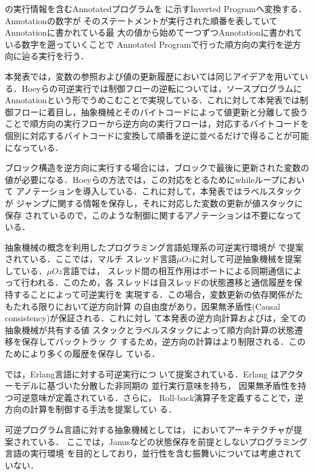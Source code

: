 \documentclass[submit,PRO]{ipsj}
\begin{document}
の実行情報を含むAnnotatedプログラムを
に示すInverted Programへ変換する．Annotationの数字が
そのステートメントが実行された順番を表していてAnnotationに書かれている最
大の値から始めて一つずつAnnotationに書かれている数字を遡っていくことで
Annotated Programで行った順方向の実行を逆方向に辿る実行を行う．

本発表では，変数の参照および値の更新履歴においては同じアイデアを用いてい
る．Hoeyらの可逆実行では制御フローの逆転については，ソースプログラムに
Annotationという形でうめこむことで実現している．これに対して本発表では制
御フローに着目し，抽象機械とそのバイトコードによって値更新と分離して扱う
ことで順方向の実行フローから逆方向の実行フローは，対応するバイトコードを
個別に対応するバイトコードに変換して順番を逆に並べるだけで得ることが可能
になっている．

ブロック構造を逆方向に実行する場合には，ブロックで最後に更新された変数の
値が必要になる．Hoeyらの方法では，この対応をとるためにwhileループにおいて
アノテーションを導入している．これに対して，本発表ではラベルスタックが
ジャンプに関する情報を保存し，それに対応した変数の更新が値スタックに保存
されているので，このような制御に関するアノテーションは不要になっている．

抽象機械の概念を利用したプログラミング言語処理系の可逆実行環境が
\cite{DBLP:conf/forte/LienhardtLMS12}で提案されている．ここでは，マルチ
スレッド言語$\mu Oz$に対して可逆抽象機械を提案している．$\mu Oz$言語では，
スレッド間の相互作用はポートによる同期通信によって行われる．このため，各
スレッドは自スレッドの状態遷移と通信履歴を保持することによって可逆実行を
実現する．この場合，変数更新の依存関係がたもたれる限りにおいて逆方向計算
の自由度があり，因果無矛盾性(Causal consistency)が保証される．これに対し
て本発表の逆方向計算および\cite{Hoey20PHD}は，全ての抽象機械が共有する値
スタックとラベルスタックによって順方向計算の状態遷移を保存してバックトラッ
ク
\cite{DBLP:journals/software/AgrawalDS91,DBLP:journals/corr/abs-1709-00828}
するため，逆方向の計算はより制限される．このためにより多くの履歴を保存し
ている．

\cite{DBLP:journals/jlp/LaneseNPV18}では，Erlang言語に対する可逆実行につ
いて提案されている．Erlang%
はアクターモデルに基づいた分散した非同期の%
並行実行意味を持ち，%
因果無矛盾性を持つ可逆意味が定義されている．さらに，
Roll-back演算子を定義することで，逆方向の計算を制御する手法を提案してい
る．

可逆プログラム言語に対する抽象機械としては，
\cite{DBLP:conf/csr/AxelsenGY07}においてアーキテクチャが提案されている．
ここでは，Janusなどの状態保存を前提としないプログラミング言語の実行環境
を目的としており，並行性を含む振舞いについては考慮されていない．
\end{document}
